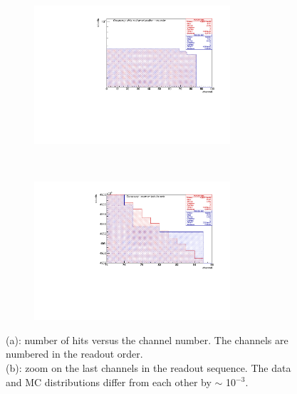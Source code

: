   \begin{figure}[!h]
    \begin{subfigure}[b]{\textwidth}
        \centering
        \includegraphics[width=0.8\textwidth]{figures/pdf/figure_00004_nhitsvschannel_roc_simulation_281.pdf}
        \caption{}
        \label{fig:tt1}
    \end{subfigure}
  \\
    \begin{subfigure}[b]{\textwidth}
        \centering
        \includegraphics[width=0.8\textwidth]{figures/pdf/figure_00014_nhitsvschannel_roc_simulation_281.pdf}
        \caption{}
        \label{fig:tt2}
    \end{subfigure}
       \caption{(a): number of hits versus the channel number. The channels are numbered in the readout order.
       \\
       (b): zoom on the last channels in the readout sequence. The data and MC distributions
       differ from each other by $\sim$ 10$^{-3}$.}
       \label{fig:2}
  \end{figure}


